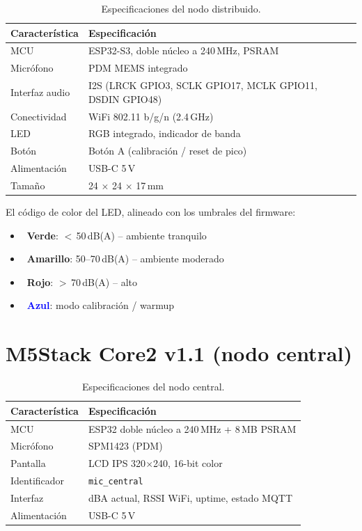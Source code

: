 \documentclass[11pt,a4paper,openany]{report}
\begin{document}
\begin{table}[H]
\centering
{}
\begin{tabularx}{\textwidth}{l X}
\toprule
\rowcolor{TableHead}
\textbf{Caracter\'istica} & \textbf{Especificaci\'on} \\ \midrule
MCU             & ESP32-S3, doble n\'ucleo a 240\,MHz, PSRAM \\
Micr\'ofono     & PDM MEMS integrado \\
Interfaz audio  & I2S (LRCK GPIO3, SCLK GPIO17, MCLK GPIO11, DSDIN GPIO48) \\
Conectividad    & WiFi 802.11 b/g/n (2.4\,GHz) \\
LED             & RGB integrado, indicador de banda \\
Bot\'on         & Bot\'on A (calibraci\'on / reset de pico) \\
Alimentaci\'on  & USB-C 5\,V \\
Tama\~no        & 24 $\times$ 24 $\times$ 17\,mm \\ \bottomrule
\end{tabularx}
\caption{Especificaciones del nodo distribuido.}
\end{table}

El c\'odigo de color del LED, alineado con los umbrales del firmware:

\begin{itemize}[leftmargin=2em]
    \item \textcolor{dbgreen}{\faCircle\ \textbf{Verde}}: $<$\,50\,dB(A) -- ambiente tranquilo
    \item \textcolor{dbyellow}{\faCircle\ \textbf{Amarillo}}: 50--70\,dB(A) -- ambiente moderado
    \item \textcolor{dbred}{\faCircle\ \textbf{Rojo}}: $>$\,70\,dB(A) -- alto
    \item \textcolor{blue}{\faCircle\ \textbf{Azul}}: modo calibraci\'on / warmup
\end{itemize}

\section{M5Stack Core2 v1.1 (nodo central)}

\begin{table}[H]
\centering
{}
\begin{tabularx}{\textwidth}{l X}
\toprule
\rowcolor{TableHead}
\textbf{Caracter\'istica} & \textbf{Especificaci\'on} \\ \midrule
MCU             & ESP32 doble n\'ucleo a 240\,MHz + 8\,MB PSRAM \\
Micr\'ofono     & SPM1423 (PDM) \\
Pantalla        & LCD IPS 320$\times$240, 16-bit color \\
Identificador   & \texttt{mic\_central} \\
Interfaz        & dBA actual, RSSI WiFi, uptime, estado MQTT \\
Alimentaci\'on  & USB-C 5\,V \\ \bottomrule
\end{tabularx}
\caption{Especificaciones del nodo central.}
\end{table}
\end{document}

